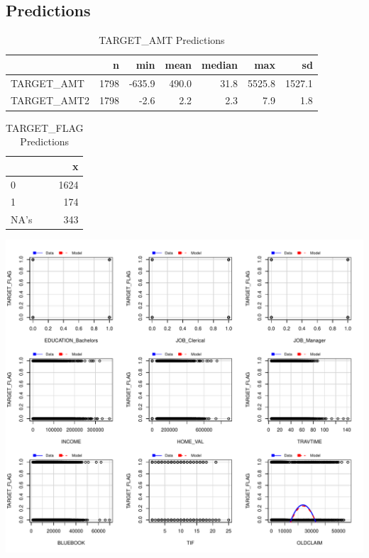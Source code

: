 \documentclass[]{article}
\begin{document}
\subsection{Predictions}\label{predictions}

\begin{table}

\caption{\label{tab:unnamed-chunk-4}TARGET_AMT Predictions}
\centering
\begin{tabular}[t]{l|r|r|r|r|r|r}
\hline
  & n & min & mean & median & max & sd\\
\hline
TARGET\_AMT & 1798 & -635.9 & 490.0 & 31.8 & 5525.8 & 1527.1\\
\hline
TARGET\_AMT2 & 1798 & -2.6 & 2.2 & 2.3 & 7.9 & 1.8\\
\hline
\end{tabular}
\end{table}

\begin{table}

\caption{\label{tab:unnamed-chunk-5}TARGET_FLAG Predictions}
\centering
\begin{tabular}[t]{l|r}
\hline
  & x\\
\hline
0 & 1624\\
\hline
1 & 174\\
\hline
NA's & 343\\
\hline
\end{tabular}
\end{table}

\includegraphics{proj4_files/figure-latex/unnamed-chunk-6-1.pdf}
\end{document}
